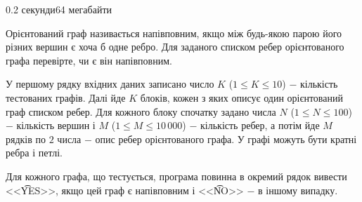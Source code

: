 \begin{problem}{}{}{}{0.2 секунди}{64 мегабайти}

Орієнтований граф називається напівповним, якщо між будь-якою парою його різних вершин є хоча б одне ребро. 
Для заданого списком ребер орієнтованого графа перевірте, чи є він напівповним.

\InputFile
У першому рядку вхідних даних записано число $K$ ($1 \le K \le 10$) $-$ кількість тестованих графів. 
Далі йде $K$ блоків, кожен з яких описує один орієнтований граф списком ребер. 
Для кожного блоку спочатку задано числа $N$ ($1 \le N \le 100$) $-$ кількість вершин і $M$ ($1 \le M \le 10\,000$) $-$
кількість ребер, а потім йде $M$ рядків по $2$ числа $-$ опис ребер орієнтованого графа. У графі можуть бути кратні ребра
і петлі.

\OutputFile
Для кожного графа, що тестується, програма повинна в окремий рядок вивести <<{\t{YES}}>>, якщо цей граф
є напівповним і  <<{\t{NO}}>> $-$ в іншому випадку.

\Example

\begin{example}
%
\end{example}

\end{problem}


